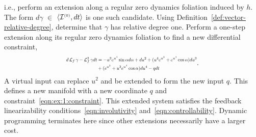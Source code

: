 \documentclass[a4paper]{ifacconf}
\begin{document}
i.e., perform an extension along a regular zero dynamics foliation induced by \(h.\)
The form \(d\gamma\) \(\in\) \(\langle \mathcal{I}^{\smash{\scriptscriptstyle(0)}}, dt \rangle\) is one such candidate.
Using Definition~\ref{def:vector-relative-degree}, determine that \(\gamma\) has relative degree one.
Perform a one-step extension along its regular zero dynamics foliation to find a new differential constraint,
\begin{equation}
  \label{eqn:ex:1:constraint}
  \scalebox{0.65}{\mbox{\ensuremath{\displaystyle%
  \begin{aligned}
    d\LieDerivative{f}\gamma - \LieDerivative{f}^2\gamma dt
      &= - u^3 e^{u^4} \sin\alpha d\alpha + du^2
      + (u^4 e^{u^3} + e^{u^4}\cos\alpha) du^3\\
      &+ (e^{u^3} + u^3 e^{u^4}\cos\alpha) du^4
      - q {dt}
  \end{aligned}
  }}}.
\end{equation}
A virtual input can replace \(u^2\) and be extended to form the new input \(q.\)
This defines a new manifold with a new coordinate \(q\) and constraint~\eqref{eqn:ex:1:constraint}.
This extended system satisfies the feedback linearizability conditions~\eqref{eqn:involutivity} and~\eqref{eqn:controllability}.
Dynamic programming terminates here since other extensions necessarily have a larger cost.
\end{document}
